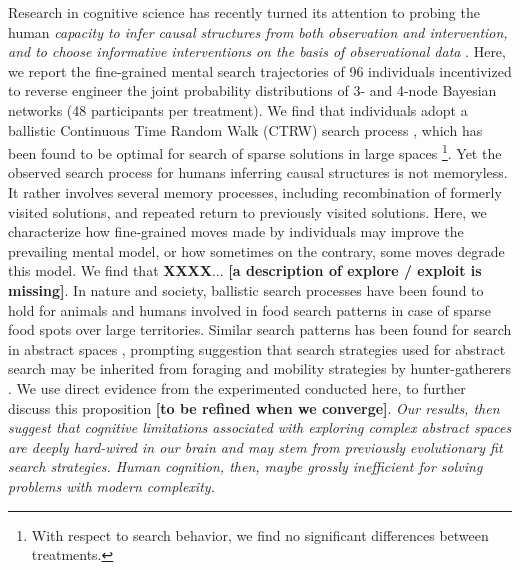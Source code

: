 Research in cognitive science has recently turned its attention to probing the human {\it capacity to infer causal structures from both observation and intervention, and to choose informative interventions on the basis of observational data} \cite{steyvers2003inferring,pearl2009causality}. Here, we report the fine-grained mental search trajectories of 96 individuals incentivized to reverse engineer the joint probability distributions of 3- and 4-node Bayesian networks (48 participants per treatment). We find that individuals adopt a ballistic Continuous Time Random Walk (CTRW) search process \cite{}, which has been found to be optimal for search of sparse solutions in large spaces \cite{viswanathan_optimizing_1999,edwards_revisiting_2007,song_modelling_2010,viswanathan_physics_2011}\footnote{With respect to search behavior, we find no significant differences between treatments.}. Yet the observed search process for humans inferring causal structures is not memoryless. It rather involves several memory processes, including recombination of formerly visited solutions, and repeated return to previously visited solutions. Here, we characterize how fine-grained moves made by individuals may improve the prevailing mental model, or how sometimes on the contrary, some moves degrade this model. We find that {\bf XXXX}... {\bf [a description of explore / exploit is missing]}. In nature and society, ballistic search processes have been found to hold for animals \cite{baronchelli_levy_2013} and humans \cite{gonzalez_understanding_2008,song_modelling_2010,rhee_levy-walk_2011} involved in food search patterns in case of sparse food spots over large territories. Similar search patterns has been found for search in abstract spaces \cite{rhodes_human_2007,radicchi_rationality_2012,radicchi_evolution_2012}, prompting suggestion that search strategies used for abstract search \cite{baronchelli_levy_2013} may be inherited from foraging and mobility strategies by hunter-gatherers \cite{brown_levy_2007,raichlen_evidence_2014}. We use direct evidence from the experimented conducted here, to further discuss this proposition {\bf [to be refined when we converge]}. {\it Our results, then suggest that cognitive limitations associated with exploring complex abstract spaces are deeply hard-wired in our brain and may stem from previously evolutionary fit search strategies.  Human cognition, then, maybe grossly inefficient for solving problems with modern complexity.}

